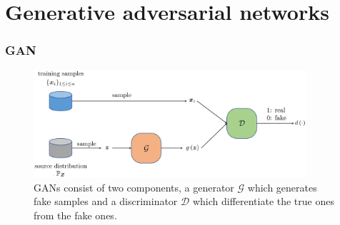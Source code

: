\documentclass[presentation]{beamer}
\begin{document}
\section{Generative adversarial networks}

\begin{frame}
    \frametitle{GAN}
        
    \begin{figure}
        \centering\includegraphics[width=0.9\textwidth]{GAN}
        \caption{GANs consist of two components, a generator $\mathcal{G}$ which generates fake samples and a discriminator $\mathcal{D}$ which differentiate the true ones from the fake ones. \label{fig:GAN}}
    \end{figure}

\end{frame}
\end{document}
